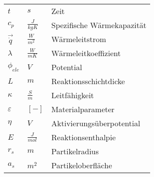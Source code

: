 \begin{tabularx}{15.1cm}{llX}
	$t$ & $s$ & Zeit\\ [0.1cm]
	$c_{p}$ & $\frac{J}{kgK}$ & Spezifische Wärmekapazität\\ [0.1cm]
	$\vec{\dot{q}}$ & $\frac{W}{m^{2}}$ & Wärmeleitstrom\\ [0.1cm]
	$\lambda$ & $\frac{W}{mK}$ & Wärmeleitkoeffizient\\ [0.1cm]
	$\phi_{ele}$ & $V$ & Potential\\ [0.1cm]
	$L$ & $m$ & Reaktionsschichtdicke\\ [0.1cm]
	$\kappa$ & $\frac{S}{m}$ & Leitfähigkeit\\ [0.1cm]
	$\varepsilon$ & $[-]$ & Materialparameter\\ [0.1cm]
	$\eta$ & $V$ & Aktivierungsüberpotential\\ [0.1cm]
	$E$ & $\frac{J}{mol}$ & Reaktionsenthalpie\\ [0.1cm]
	$r_{s}$ & $m$ & Partikelradius\\ [0.1cm]
	$a_{s}$ & $m^{2}$ & Partikeloberfläche\\ [0.1cm]
\end{tabularx}	

